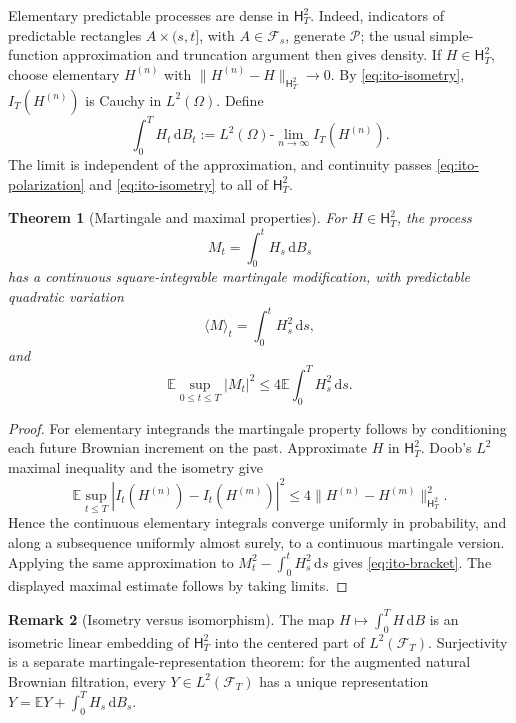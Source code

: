 \documentclass[10pt,a4paper]{article}
\numberwithin{equation}{section}
\theoremstyle{blueplain}
\newtheorem{theorem}{Theorem}[section]
\theoremstyle{definition}
\newtheorem{remark}[theorem]{Remark}
\newcommand{\E}{\mathbb E}
\newcommand{\F}{\mathcal F}
\newcommand{\dd}{\,\mathrm d}
\begin{document}
Elementary predictable processes are dense in \(\mathsf H_T^2\).  Indeed,
indicators of predictable rectangles \(A\times(s,t]\), with
\(A\in\F_s\), generate \(\mathcal P\); the usual simple-function
approximation and truncation argument then gives density.  If \(H\in
\mathsf H_T^2\), choose elementary \(H^{(n)}\) with
\(\|H^{(n)}-H\|_{\mathsf H_T^2}\to0\).  By
\eqref{eq:ito-isometry}, \(I_T(H^{(n)})\) is Cauchy in
\(L^2(\Omega)\).  Define
\begin{equation}
  \int_0^T H_t\dd B_t
  :=L^2(\Omega)\text{-}\lim_{n\to\infty}I_T(H^{(n)}).
  \label{eq:ito-L2-definition}
\end{equation}
The limit is independent of the approximation, and continuity passes
\eqref{eq:ito-polarization} and \eqref{eq:ito-isometry} to all of
\(\mathsf H_T^2\).

\begin{theorem}[Martingale and maximal properties]
For \(H\in\mathsf H_T^2\), the process
\[
  M_t=\int_0^t H_s\dd B_s
\]
has a continuous square-integrable martingale modification, with predictable
quadratic variation
\begin{equation}
  \langle M\rangle_t=\int_0^t H_s^2\dd s,
  \label{eq:ito-bracket}
\end{equation}
and
\begin{equation}
  \E\sup_{0\le t\le T}|M_t|^2
  \le4\E\int_0^T H_s^2\dd s.
  \label{eq:ito-doob}
\end{equation}
\end{theorem}

\begin{proof}
For elementary integrands the martingale property follows by conditioning each
future Brownian increment on the past.  Approximate \(H\) in
\(\mathsf H_T^2\).  Doob's \(L^2\) maximal inequality and the isometry give
\[
 \E\sup_{t\le T}|I_t(H^{(n)})-I_t(H^{(m)})|^2
 \le4\|H^{(n)}-H^{(m)}\|_{\mathsf H_T^2}^2.
\]
Hence the continuous elementary integrals converge uniformly in probability,
and along a subsequence uniformly almost surely, to a continuous martingale
version.  Applying the same approximation to
\(M_t^2-\int_0^tH_s^2\dd s\) gives
\eqref{eq:ito-bracket}.  The displayed maximal estimate follows by taking
limits.
\end{proof}

\begin{remark}[Isometry versus isomorphism]
The map \(H\mapsto\int_0^T H\dd B\) is an isometric linear embedding of
\(\mathsf H_T^2\) into the centered part of \(L^2(\F_T)\).  Surjectivity is a
separate martingale-representation theorem: for the augmented natural
Brownian filtration, every \(Y\in L^2(\F_T)\) has a unique representation
\(Y=\E Y+\int_0^T H_s\dd B_s\).
\end{remark}
\end{document}
